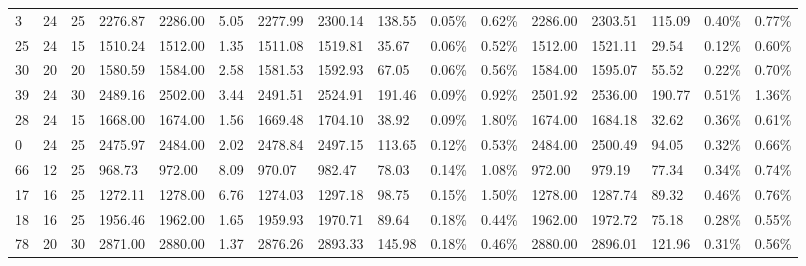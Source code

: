 \begin{longtable}{l|ll|lll|lllll|lllll}
   3  & 24                         & 25                         & 2276.87                   & 2286.00     & 5.05                & 2277.99 & 2300.14 & 138.55 & 0.05\%  & 0.62\% & 2286.00 & 2303.51 & 115.09 & 0.40\%  & 0.77\% \\
   25 & 24                         & 15                         & 1510.24                   & 1512.00     & 1.35                & 1511.08 & 1519.81 & 35.67  & 0.06\%  & 0.52\% & 1512.00 & 1521.11 & 29.54  & 0.12\%  & 0.60\% \\
   30 & 20                         & 20                         & 1580.59                   & 1584.00     & 2.58                & 1581.53 & 1592.93 & 67.05  & 0.06\%  & 0.56\% & 1584.00 & 1595.07 & 55.52  & 0.22\%  & 0.70\% \\
   39 & 24                         & 30                         & 2489.16                   & 2502.00     & 3.44                & 2491.51 & 2524.91 & 191.46 & 0.09\%  & 0.92\% & 2501.92 & 2536.00 & 190.77 & 0.51\%  & 1.36\% \\
   28 & 24                         & 15                         & 1668.00                   & 1674.00     & 1.56                & 1669.48 & 1704.10 & 38.92  & 0.09\%  & 1.80\% & 1674.00 & 1684.18 & 32.62  & 0.36\%  & 0.61\% \\
   0  & 24                         & 25                         & 2475.97                   & 2484.00     & 2.02                & 2478.84 & 2497.15 & 113.65 & 0.12\%  & 0.53\% & 2484.00 & 2500.49 & 94.05  & 0.32\%  & 0.66\% \\
   66 & 12                         & 25                         & 968.73                    & 972.00      & 8.09                & 970.07  & 982.47  & 78.03  & 0.14\%  & 1.08\% & 972.00  & 979.19  & 77.34  & 0.34\%  & 0.74\% \\
   17 & 16                         & 25                         & 1272.11                   & 1278.00     & 6.76                & 1274.03 & 1297.18 & 98.75  & 0.15\%  & 1.50\% & 1278.00 & 1287.74 & 89.32  & 0.46\%  & 0.76\% \\
   18 & 16                         & 25                         & 1956.46                   & 1962.00     & 1.65                & 1959.93 & 1970.71 & 89.64  & 0.18\%  & 0.44\% & 1962.00 & 1972.72 & 75.18  & 0.28\%  & 0.55\% \\
   78 & 20                         & 30                         & 2871.00                   & 2880.00     & 1.37                & 2876.26 & 2893.33 & 145.98 & 0.18\%  & 0.46\% & 2880.00 & 2896.01 & 121.96 & 0.31\%  & 0.56\% \\

\end{longtable}
